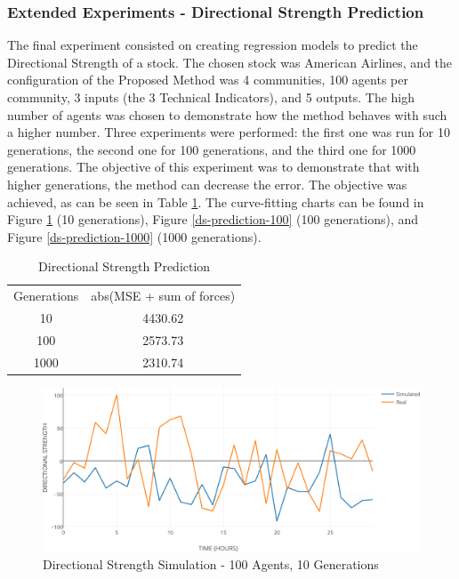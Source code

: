 \documentclass[12pt,journal,draftcls,onecolumn]{IEEEtran}
\begin{document}
\subsubsection{Extended Experiments - Directional Strength Prediction}
  
The final experiment consisted on creating regression models to predict the Directional Strength of a stock. The chosen stock was American Airlines, and the configuration of the Proposed Method was 4 communities, 100 agents per community, 3 inputs (the 3 Technical Indicators), and 5 outputs. The high number of agents was chosen to demonstrate how the method behaves with such a higher number. Three experiments were performed: the first one was run for 10 generations, the second one for 100 generations, and the third one for 1000 generations. The objective of this experiment was to demonstrate that with higher generations, the method can decrease the error. The objective was achieved, as can be seen in Table \ref{ds-mse-table}. The curve-fitting charts can be found in Figure \ref{ds-prediction-10} (10 generations), Figure \ref{ds-prediction-100} (100 generations), and Figure \ref{ds-prediction-1000} (1000 generations).

\begin{table}
  \centering
    \caption{Directional Strength Prediction}
    \label{ds-mse-table}
    \begin{tabular}{ c c }
        Generations & abs(MSE + sum of forces) \\ 
        10 & 4430.62 \\ 
        100 & 2573.73 \\ 
        1000 & 2310.74 \\ 
    \end{tabular} 
\end{table}

\begin{figure}[htp]
\caption{Directional Strength Simulation - 100 Agents, 10 Generations}
\label{ds-prediction-10}
\begin{center}
\includegraphics[width=1\columnwidth]{figures/ds-sim-100agents-10gen/ds-sim-100agents-10gen.png}
\end{center}
\end{figure}
\end{document}
